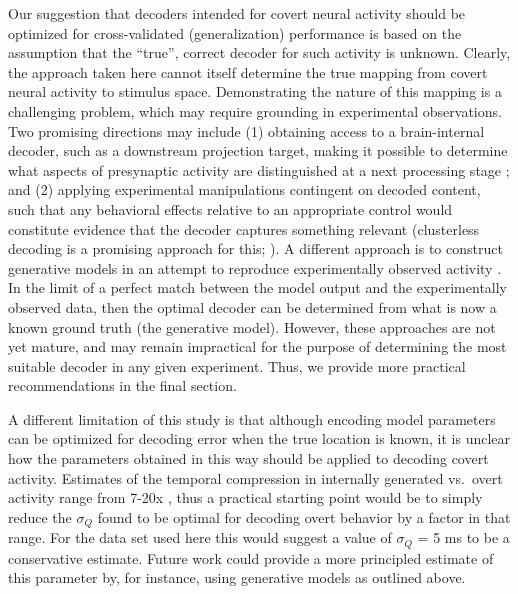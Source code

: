 \documentclass[11pt]{article}
\let\cite=\citep
\let\citeNP=\citealt
\begin{document}
Our suggestion that decoders intended for covert neural activity
should be optimized for cross-validated (generalization) performance
is based on the assumption that the ``true'', correct decoder for such
activity is unknown. Clearly, the approach taken here cannot itself
determine the true mapping from covert neural activity to stimulus
space. Demonstrating the nature of this mapping is a challenging
problem, which may require grounding in experimental observations. Two
promising directions may include (1) obtaining access to a
brain-internal decoder, such as a downstream projection target, making
it possible to determine what aspects of presynaptic activity are
distinguished at a next processing stage {\color{red}
  \cite{Ji2007,Lansink2009,Olafsdottir2016,Jadhav2016a}}; and (2)
applying experimental manipulations contingent on decoded content,
such that any behavioral effects relative to an appropriate control
would constitute evidence that the decoder captures something
relevant {\color{red}(clusterless decoding is a promising approach for
  this; \citeNP{Kloosterman2014,Deng2015})}. A different approach is
to construct generative models in an attempt to reproduce
experimentally observed activity
\cite{johnson2008holscherbk,Pfeiffer2015,Chen2016a}. In the limit of a
perfect match between the model output and the experimentally observed
data, then the optimal decoder can be determined from what is now a
known ground truth (the generative model). {\color{red} However, these
  approaches are not yet mature, and may remain impractical for the
  purpose of determining the most suitable decoder in any given
  experiment. Thus, we provide more practical recommendations in the
  final section.}

A {\color{red} different} limitation of this study is that although
encoding model parameters can be optimized for decoding error when the
true location is known, it is unclear how the parameters obtained in
this way should be applied to decoding covert activity. Estimates of
the temporal compression in internally generated vs.\ overt activity
range from 7-20x \cite{Lee2002,Davidson2009,Buzsaki2015a}, thus a
practical starting point would be to simply reduce the $\sigma_Q$
found to be optimal for decoding overt behavior by a factor in that
range. For the data set used here this would suggest a value of
$\sigma_Q$ = 5 ms to be a conservative estimate. Future work could
provide a more principled estimate of this parameter by, for instance,
using generative models as outlined above.
\end{document}
